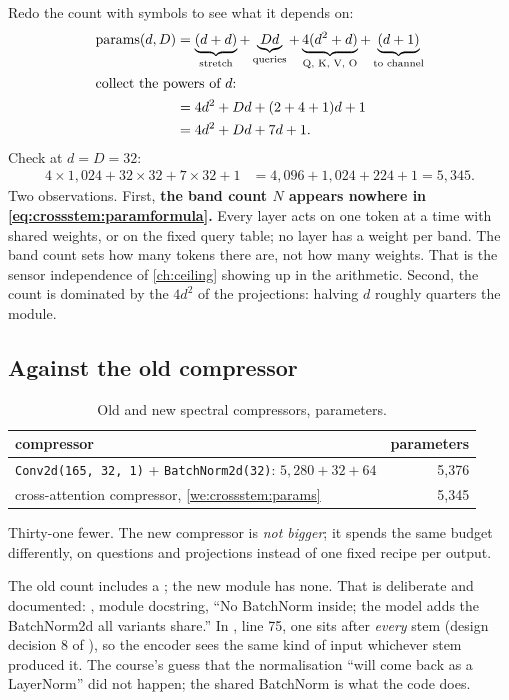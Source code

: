 Redo the count with symbols to see what it depends on:
\begin{align}
  \text{params}(d, D) &= \underbrace{(d + d)}_{\text{stretch}} + \underbrace{Dd}_{\text{queries}} + \underbrace{4(d^2 + d)}_{\text{Q, K, V, O}} + \underbrace{(d + 1)}_{\text{to channel}} \nonumber\\
  \intertext{collect the powers of $d$:}
  &= 4d^2 + Dd + (2 + 4 + 1)d + 1 \nonumber\\
  &= 4d^2 + Dd + 7d + 1 . \label{eq:crossstem:paramformula}
\end{align}
Check at $d = D = 32$:
\begin{align*}
  4\times1{,}024 + 32\times32 + 7\times32 + 1 &= 4{,}096 + 1{,}024 + 224 + 1 = 5{,}345 .
\end{align*}
Two observations. First, \textbf{the band count $N$ appears nowhere in \cref{eq:crossstem:paramformula}.} Every layer acts on one token at a time with shared weights, or on the fixed query table; no layer has a weight per band. The band count sets how many tokens there are, not how many weights. That is the sensor independence of \cref{ch:ceiling} showing up in the arithmetic. Second, the count is dominated by the $4d^2$ of the projections: halving $d$ roughly quarters the module.

\subsection{Against the old compressor}

\begin{table}[htbp]\centering
\caption{Old and new spectral compressors, parameters.}\label{tab:crossstem:compare}
\begin{tabular}{lr}\toprule
compressor & parameters\\\midrule
\texttt{Conv2d(165, 32, 1)} + \texttt{BatchNorm2d(32)}: $5{,}280 + 32 + 64$ & 5,376\\
cross-attention compressor, \cref{we:crossstem:params} & 5,345\\\bottomrule
\end{tabular}
\end{table}

Thirty-one fewer. The new compressor is \emph{not bigger}; it spends the same budget differently, on questions and projections instead of one fixed recipe per output.

\begin{sourcenote}
The old count includes a ; the new module has none. That is deliberate and documented: , module docstring, ``No BatchNorm inside; the model adds the BatchNorm2d all variants share.'' In , line 75, one  sits after \emph{every} stem (design decision 8 of ), so the encoder sees the same kind of input whichever stem produced it. The course's guess that the normalisation ``will come back as a LayerNorm'' did not happen; the shared BatchNorm is what the code does.
\end{sourcenote}

